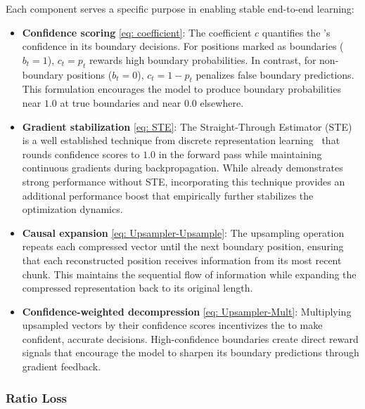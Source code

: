 Each component serves a specific purpose in enabling stable end-to-end learning:
\begin{itemize}
    \item \textbf{Confidence scoring} \eqref{eq: coefficient}: The coefficient $c$ quantifies the \router{}'s confidence in its boundary decisions.
    For positions marked as boundaries ($b_t=1$), $c_t=p_t$ rewards high boundary probabilities.
    In contrast, for non-boundary positions ($b_t=0$), $c_t=1-p_t$ penalizes false boundary predictions.
    This formulation encourages the model to produce boundary probabilities near $1.0$ at true boundaries and near $0.0$ elsewhere.
    \item \textbf{Gradient stabilization} \eqref{eq: STE}: The Straight-Through Estimator (STE)~\citep{STE} is a well established technique from discrete representation learning~\citep{VQ-VAE, GumbelSoftmax} that rounds confidence scores to $1.0$ in the forward pass while maintaining continuous gradients during backpropagation.
    While \model{} already demonstrates strong performance without STE, incorporating this technique provides an additional performance boost that empirically further stabilizes the optimization dynamics.
    \item \textbf{Causal expansion} \eqref{eq: Upsampler-Upsample}: The upsampling operation repeats each compressed vector until the next boundary position, ensuring that each reconstructed position receives information from its most recent chunk.
    This maintains the sequential flow of information while expanding the compressed representation back to its original length.
    \item \textbf{Confidence-weighted decompression} \eqref{eq: Upsampler-Mult}:
    Multiplying upsampled vectors by their confidence scores incentivizes the \router{} to make confident, accurate decisions.
    High-confidence boundaries create direct reward signals that encourage the model to sharpen its boundary predictions through gradient feedback.
\end{itemize}

\subsubsection{Ratio Loss}

